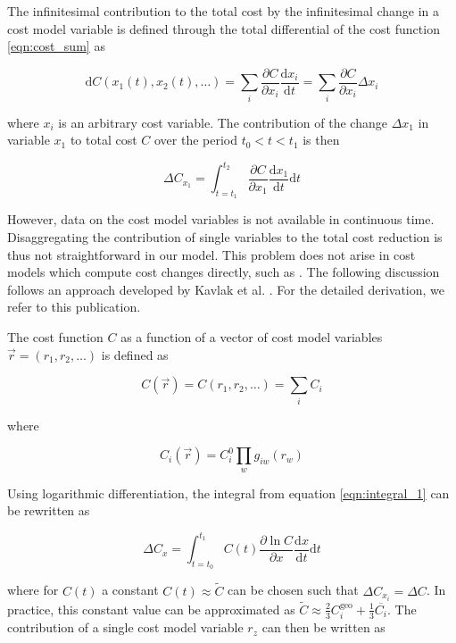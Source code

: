 \documentclass[10pt]{article}
\begin{document}
The infinitesimal contribution to the total cost by the infinitesimal change in a cost model variable is defined through the total differential of the cost function \ref{eqn:cost_sum} as

\begin{equation}
\text{d}C(x_1 (t), x_2(t), \dots) = \sum_i \frac{\partial C }{\partial x_i}     \frac{\text{d}x_i}{\text{d}t} = \sum_i \frac{\partial C }{\partial x_i}  \Delta x_i
\end{equation}

where $x_i$ is an arbitrary cost variable. The contribution of the change $\Delta x_1$ in variable $x_1$ to total cost $C$ over the period $t_0 < t < t_1 $ is then

\begin{equation}
\Delta C_{x_1} = \int_{t=t_1}^{t_2} \frac{\partial C }{\partial x_1} \frac{\text{d}x_1}{\text{d}t} \text{d}t
\label{eqn:integral_1}
\end{equation}

However, data on the cost model variables is not available in continuous time. Disaggregating the contribution of single variables to the total cost reduction is thus not straightforward in our model. This problem does not arise in cost models which compute cost changes directly, such as \cite{nemet2012solar} \cite{goodrich2013assessing}. The following discussion follows an approach developed by Kavlak et al. \cite{kavlak2018evaluating}. For the detailed derivation, we refer to this publication.

The cost function $C$ as a function of a vector of cost model variables $\vec{r}=(r_1,r_2,\dots)$ is defined as

\begin{equation}
C(\vec{r}) = C(r_1,r_2, \dots) = \sum_i C_i
\end{equation}

where

\begin{equation}
C_i(\vec{r}) = C_i^0 \prod_w g_{iw}(r_w)
\end{equation}

Using logarithmic differentiation, the integral from equation \ref{eqn:integral_1} can be rewritten as

\begin{equation}
\Delta C_x = \int_{t=t_0}^{t_1} C(t) \frac{ \partial \ln C }{ \partial x } \frac{ \text{d} x }{ \text{d} t} \text{d} t
\end{equation}

where for $C(t)$ a constant $C(t) \approx \tilde{C} $ can be chosen such that $\Delta C_{x_i} = \Delta C$. In practice, this constant value can be approximated as $\tilde{C} \approx \frac{2}{3} C_i^\text{geo} + \frac{1}{3} \overline{C_i}$. The contribution of a single cost model variable $r_z$ can then be written as
\end{document}
